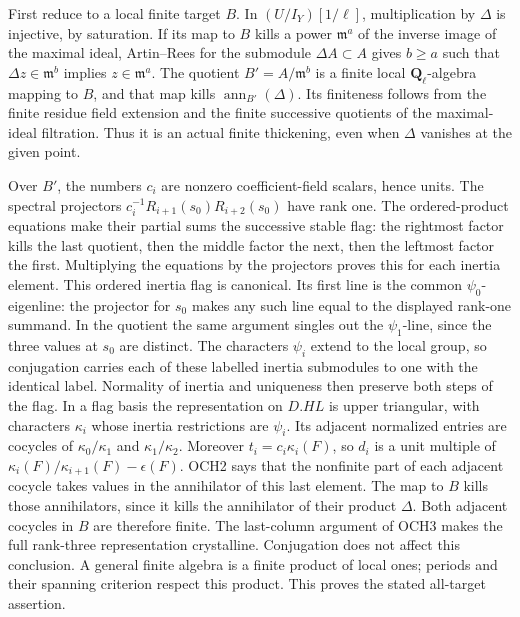 First reduce to a local finite target \(B\).  In
\((U/I_Y)[1/\ell]\), multiplication by \(\Delta\) is
injective, by saturation.  If its map to \(B\) kills a power
\(\mathfrak m^a\) of the inverse image of the maximal ideal,
Artin--Rees for the submodule \(\Delta A\subset A\) gives
\(b\ge a\) such that
\(\Delta z\in\mathfrak m^b\) implies
\(z\in\mathfrak m^a\).  The quotient
\(B'=A/\mathfrak m^b\) is a finite local
\(\mathbf Q_\ell\)-algebra mapping to \(B\), and that map
kills \(\operatorname{ann}_{B'}(\Delta)\).  Its finiteness
follows from the finite residue field extension and the finite
successive quotients of the maximal-ideal filtration.  Thus it is
an actual finite thickening, even when \(\Delta\) vanishes
at the given point.

Over \(B'\), the numbers \(c_i\) are nonzero coefficient-field
scalars, hence units.  The spectral projectors
\(c_i^{-1}R_{i+1}(s_0)R_{i+2}(s_0)\) have rank one.
The ordered-product equations make their partial sums the successive
stable flag: the rightmost factor kills the last quotient, then the
middle factor the next, then the leftmost factor the first.
Multiplying the equations by the projectors proves this for each
inertia element.  This ordered inertia flag is canonical.  Its first
line is the common \(\psi_0\)-eigenline: the projector for
\(s_0\) makes any such line equal to the displayed rank-one
summand.  In the quotient the same argument singles out the
\(\psi_1\)-line, since the three values at \(s_0\) are
distinct.  The characters \(\psi_i\) extend to the
local group, so conjugation carries each of these labelled inertia
submodules to one with the identical label.  Normality of inertia
and uniqueness then preserve both steps of the flag.
In a flag basis the representation on \(D.HL\) is upper triangular, with characters
\(\kappa_i\) whose inertia restrictions are \(\psi_i\).
Its adjacent normalized entries are cocycles of
\(\kappa_0/\kappa_1\) and \(\kappa_1/\kappa_2\).
Moreover \(t_i=c_i\kappa_i(F)\), so \(d_i\) is a unit
multiple of \(\kappa_i(F)/\kappa_{i+1}(F)-\epsilon(F)\).
OCH2 says that the nonfinite part of each adjacent cocycle takes
values in the annihilator of this last element.  The map to \(B\)
kills those annihilators, since it kills the annihilator of their
product \(\Delta\).  Both adjacent cocycles in \(B\) are
therefore finite.  The last-column argument of OCH3 makes the full
rank-three representation crystalline.  Conjugation does not affect
this conclusion.  A general finite algebra is a finite product of
local ones; periods and their spanning criterion respect this
product.  This proves the stated all-target assertion.

